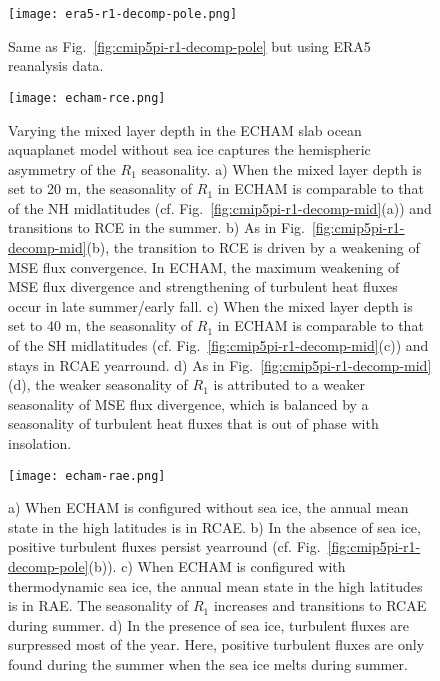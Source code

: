 \documentclass{ametsocV5}
\begin{document}
\begin{figure}[t]
  \noindent\texttt{[image: era5-r1-decomp-pole.png]}\\
  \caption{Same as Fig.~\ref{fig:cmip5pi-r1-decomp-pole} but using ERA5 reanalysis data.}
  \label{fig:era5-r1-decomp-pole}
\end{figure}

\begin{figure}[t]
  \noindent\texttt{[image: echam-rce.png]}\\
  \caption{Varying the mixed layer depth in the ECHAM slab ocean aquaplanet model without sea ice captures the hemispheric asymmetry of the \(R_{1}\) seasonality. a) When the mixed layer depth is set to 20 m, the seasonality of \(R_{1}\) in ECHAM is comparable to that of the NH midlatitudes (cf. Fig.~\ref{fig:cmip5pi-r1-decomp-mid}(a)) and transitions to RCE in the summer. b) As in Fig.~\ref{fig:cmip5pi-r1-decomp-mid}(b), the transition to RCE is driven by a weakening of MSE flux convergence. In ECHAM, the maximum weakening of MSE flux divergence and strengthening of turbulent heat fluxes occur in late summer/early fall. c) When the mixed layer depth is set to 40 m, the seasonality of \(R_{1}\) in ECHAM is comparable to that of the SH midlatitudes (cf. Fig.~\ref{fig:cmip5pi-r1-decomp-mid}(c)) and stays in RCAE yearround. d) As in Fig.~\ref{fig:cmip5pi-r1-decomp-mid}(d), the weaker seasonality of \(R_{1}\) is attributed to a weaker seasonality of MSE flux divergence, which is balanced by a seasonality of turbulent heat fluxes that is out of phase with insolation.}
  \label{fig:echam-rce}
\end{figure}

\begin{figure}[t]
  \noindent\texttt{[image: echam-rae.png]}\\
  \caption{a) When ECHAM is configured without sea ice, the annual mean state in the high latitudes is in RCAE. b) In the absence of sea ice, positive turbulent fluxes persist yearround (cf. Fig.~\ref{fig:cmip5pi-r1-decomp-pole}(b)). c) When ECHAM is configured with thermodynamic sea ice, the annual mean state in the high latitudes is in RAE. The seasonality of \(R_{1}\) increases and transitions to RCAE during summer. d) In the presence of sea ice, turbulent fluxes are surpressed most of the year. Here, positive turbulent fluxes are only found during the summer when the sea ice melts during summer.}
  \label{fig:echam-rae}
\end{figure}
\end{document}

